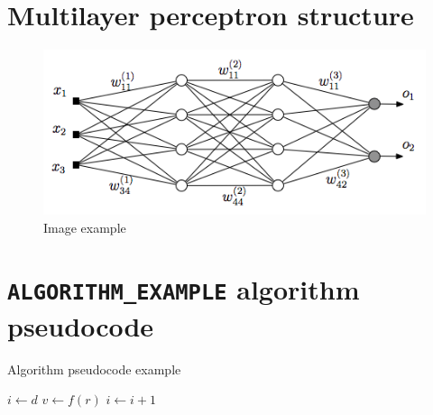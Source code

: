 \documentclass[11pt, a4paper]{article}
\begin{document}
\section{Multilayer perceptron structure}
\begin{figure}[H]
    \centering
\includegraphics[scale=0.5]{img/MLP}
\caption{Image example}
\label{img:mlp}
\end{figure}


\newpage
\section{\texttt{ALGORITHM\_EXAMPLE} algorithm pseudocode}
\begin{algorithm}[H]
\caption{Algorithm pseudocode example}
\begin{algorithmic}[1]
    \State $i \gets d $
            \State $v \gets f(r)$  
        \EndFor
        \State $i \gets i + 1$
    \EndWhile
\EndProcedure
\end{algorithmic}
\label{alg:multivariate pseudocode}
\end{algorithm}
\end{document}
